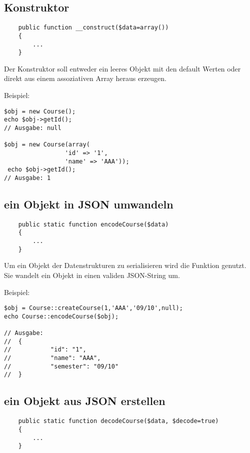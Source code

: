 \subsection{Konstruktor}
\begin{minipage}{\textwidth}
\begin{lstlisting}
    public function __construct($data=array())
    {
    	...
    }
\end{lstlisting}
\end{minipage}

Der Konstruktor soll entweder ein leeres Objekt mit den default Werten oder direkt aus einem assoziativen Array heraus erzeugen.

\begin{minipage}{\textwidth}
Beispiel:
\begin{lstlisting}
$obj = new Course();
echo $obj->getId();
// Ausgabe: null

$obj = new Course(array(
                 'id' => '1',
                 'name' => 'AAA'));
 echo $obj->getId();
// Ausgabe: 1
\end{lstlisting}
\end{minipage}

\subsection{ein Objekt in JSON umwandeln}
\begin{minipage}{\textwidth}
\begin{lstlisting}
    public static function encodeCourse($data)
    {
    	...
    }
\end{lstlisting}
\end{minipage}

Um ein Objekt der Datenstrukturen zu serialisieren wird die  Funktion genutzt. Sie wandelt ein Objekt in einen validen JSON-String um.

\begin{minipage}{\textwidth}
Beispiel:
\begin{lstlisting}
$obj = Course::createCourse(1,'AAA','09/10',null);
echo Course::encodeCourse($obj);

// Ausgabe: 
//	{
//           "id": "1",
//           "name": "AAA",
//           "semester": "09/10"
//	}
\end{lstlisting}
\end{minipage}

\subsection{ein Objekt aus JSON erstellen}
\begin{minipage}{\textwidth}
\begin{lstlisting}
    public static function decodeCourse($data, $decode=true)
    {
    	...
    }
\end{lstlisting}
\end{minipage}

